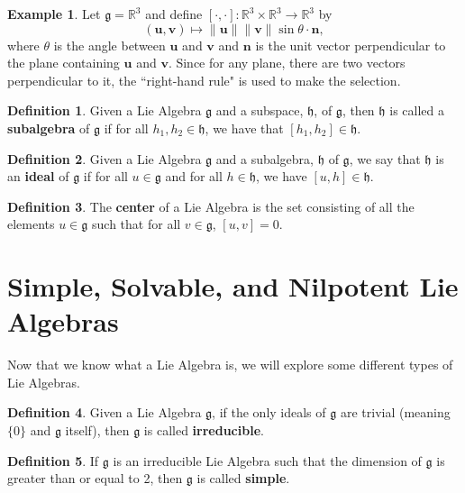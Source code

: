 \documentclass[12pt]{article}
\theoremstyle{definition}
\newtheorem{definition}{Definition}[section]
\theoremstyle{definition}
\newtheorem{exmp}{Example}[section]
\newcommand{\norm}[1]{\| #1 \|}
\begin{document}
        \begin{exmp}
            Let $\mathfrak{g}=\mathbb{R}^3$ and define $[\cdot,
            \cdot]:\mathbb{R}^3\times\mathbb{R}^3\to\mathbb{R}^3$ by
                \begin{equation*}
                    (\mathbf{u},
                    \mathbf{v})\mapsto\norm{\mathbf{u}}\norm{\mathbf{v}}\sin\theta\cdot\mathbf{n},
                \end{equation*}
            where $\theta$ is the angle between $\mathbf{u}$ and $\mathbf{v}$
            and $\mathbf{n}$ is the unit vector perpendicular to the plane
            containing $\mathbf{u}$ and $\mathbf{v}$. Since for any plane,
            there are two vectors perpendicular to it, the ``right-hand rule"
            is used to make the selection. 
        \end{exmp}
        \begin{definition}
            Given a Lie Algebra $\mathfrak{g}$ and a subspace, $\mathfrak{h}$,
            of $\mathfrak{g}$, then $\mathfrak{h}$ is called
            a \textbf{subalgebra} of $\mathfrak{g}$ if for all $h_1,
            h_2\in\mathfrak{h}$, we have that $[h_1, h_2]\in\mathfrak{h}$.
        \end{definition}
        \begin{definition}
            Given a Lie Algebra $\mathfrak{g}$ and a subalgebra, $\mathfrak{h}$
            of $\mathfrak{g}$, we say that $\mathfrak{h}$ is an \textbf{ideal}
            of $\mathfrak{g}$ if for all $u\in\mathfrak{g}$ and for all
            $h\in\mathfrak{h}$, we have $[u, h]\in\mathfrak{h}$.
        \end{definition}
        \begin{definition}
            The \textbf{center} of a Lie Algebra is the set consisting of all
            the elements $u\in \mathfrak{g}$ such that for all $v\in
            \mathfrak{g}$, $[u, v]=0$.
        \end{definition}
    \section{Simple, Solvable, and Nilpotent Lie Algebras}
        Now that we know what a Lie Algebra is, we will explore some different
        types of Lie Algebras.
        \begin{definition}
            Given a Lie Algebra $\mathfrak{g}$, if the only ideals of
            $\mathfrak{g}$ are trivial (meaning $\{0\}$ and $\mathfrak{g}$
            itself), then $\mathfrak{g}$ is called \textbf{irreducible}.
        \end{definition}
        \begin{definition}
            If $\mathfrak{g}$ is an irreducible Lie Algebra such that the
            dimension of $\mathfrak{g}$ is greater than or equal to 2, then
            $\mathfrak{g}$  is called \textbf{simple}.
        \end{definition}
\end{document}
